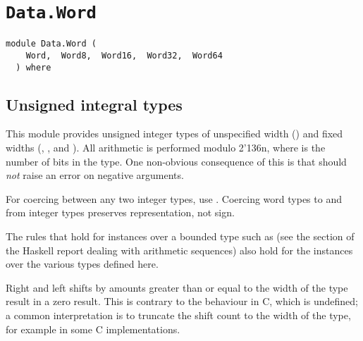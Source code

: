 \chapter{\texttt{Data.Word}}
\label{module:Data.Word}
\haddockbeginheader
{\haddockverb\begin{verbatim}
module Data.Word (
    Word,  Word8,  Word16,  Word32,  Word64
  ) where\end{verbatim}}
\haddockendheader

\section{Unsigned integral types
}
This module provides unsigned integer types of unspecified width ()
and fixed widths (, ,  and ).  All
arithmetic is performed modulo 2{\char '136}n, where  is the number of bits in
the type.  One non-obvious consequence of this is that 
  should \emph{not} raise an error on negative arguments.
\par
For coercing between any two integer types, use
.  Coercing word types to and from integer
types preserves representation, not sign.
\par
The rules that hold for  instances over a bounded type
such as  (see the section of the Haskell report dealing
with arithmetic sequences) also hold for the  instances
over the various  types defined here.
\par
Right and left shifts by amounts greater than or equal to the width of
the type result in a zero result.  This is contrary to the behaviour
in C, which is undefined; a common interpretation is to truncate the
shift count to the width of the type, for example  in
some C implementations.
\par


